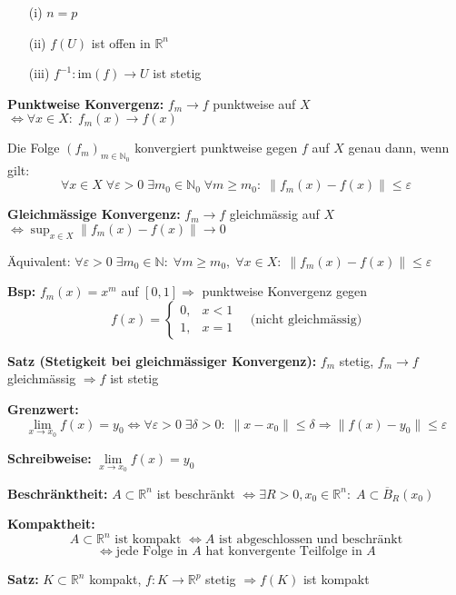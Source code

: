 \begin{itemize}
  \item[(i)] \(n = p\)
  \item[(ii)] \(f(U)\) ist offen in \(\mathbb{R}^n\)
  \item[(iii)] \(f^{-1}: \text{im}(f) \to U\) ist stetig
\end{itemize}


\textbf{Punktweise Konvergenz:}  
\(f_m \to f\) punktweise auf \(X\)  
\(\Leftrightarrow \forall x \in X:\; f_m(x) \to f(x)\)

Die Folge $(f_m)_{m \in \mathbb{N}_0}$ konvergiert punktweise gegen $f$ auf $X$ genau dann, wenn gilt:
\[
\forall x \in X\; \forall \varepsilon > 0\; \exists m_0 \in \mathbb{N}_0\; \forall m \ge m_0:\; \|f_m(x) - f(x)\| \le \varepsilon
\]

\textbf{Gleichmässige Konvergenz:}  
\(f_m \to f\) gleichmässig auf \(X\)  
\(\Leftrightarrow \sup_{x \in X} \|f_m(x) - f(x)\| \to 0\)

Äquivalent:  
\(\forall \varepsilon > 0\; \exists m_0 \in \mathbb{N}:\; \forall m \ge m_0,\; \forall x \in X:\; \|f_m(x) - f(x)\| \le \varepsilon\)

\textbf{Bsp:} \(f_m(x) = x^m\) auf \([0,1] \Rightarrow\) punktweise Konvergenz gegen  
\[
f(x) = \begin{cases}
0, & x < 1 \\
1, & x = 1
\end{cases}
\quad \text{(nicht gleichmässig)}
\]

\textbf{Satz (Stetigkeit bei gleichmässiger Konvergenz):}  
\(f_m\) stetig,\; \(f_m \to f\) gleichmässig \(\Rightarrow f\) ist stetig


\textbf{Grenzwert:}  
\[
\lim_{x \to x_0} f(x) = y_0 \Leftrightarrow
\forall \varepsilon > 0\; \exists \delta > 0:\;
\|x - x_0\| \leq \delta \Rightarrow \|f(x) - y_0\| \leq \varepsilon
\]

\textbf{Schreibweise:}  
\( \lim\limits_{x \to x_0} f(x) = y_0 \)

\textbf{Beschränktheit:}  
\(A \subset \mathbb{R}^n\) ist beschränkt \(\Leftrightarrow \exists R > 0, x_0 \in \mathbb{R}^n:\; A \subset \overline{B}_R(x_0)\)

\textbf{Kompaktheit:}  
\[
A \subset \mathbb{R}^n \text{ ist kompakt } \Leftrightarrow A \text{ ist abgeschlossen und beschränkt}
\]
\[
\Leftrightarrow \text{jede Folge in } A \text{ hat konvergente Teilfolge in } A
\]

\textbf{Satz:}  
\(K \subset \mathbb{R}^n\) kompakt,\; \(f: K \to \mathbb{R}^p\) stetig  
\(\Rightarrow f(K)\) ist kompakt

